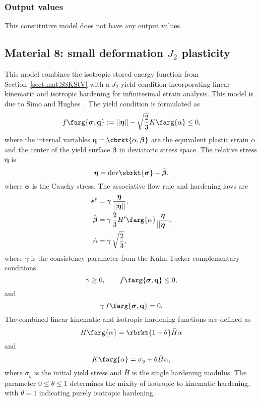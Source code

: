 \subsubsection{Output values}
This constitutive model does not have any output values.

\subsection{Material 8: small deformation $J_{2}$ plasticity}
\label{sect.mat.SS.J2.LinearHardening}
This model combines the isotropic stored energy function from 
Section~\ref{sect.mat.SSKStV} with a $J_{2}$ yield
condition incorporating linear kinematic and 
isotropic hardening for infinitesimal strain analysis. 
This model is due to Simo and Hughes~\cite{Simo1998}. 
The yield condition is formulated as
\begin{equation}
	f\farg{\boldsymbol{\sigma}, \mathbf{q}} := 
	||\boldsymbol{\eta}|| 
	- \sqrt{\frac{2}{3}} K\farg{\alpha} \le 0,
\end{equation}
where the internal variables 
$\mathbf{q} = \cbrkt{\alpha, \bar{\boldsymbol{\beta}}}$ are
the equivalent plastic strain $\alpha$ and the center of
the yield surface $\bar{\boldsymbol{\beta}}$ in deviatoric
stress space. The relative stress $\boldsymbol{\eta}$ is
\begin{equation}
\boldsymbol{\eta} = \textrm{dev}\sbrkt{\boldsymbol\sigma} - 
\bar{\boldsymbol{\beta}},
\end{equation}
where $\boldsymbol{\sigma}$ is the Cauchy stress. The associative flow rule
and hardening laws are
\begin{align}
\Dot{\boldsymbol{\epsilon}}^{p} &= \gamma\,
   \frac{\boldsymbol{\eta}}{||\boldsymbol{\eta}||}, \\
\Dot{\Bar{\boldsymbol{\beta}}} &= \gamma\, \frac{2}{3} H'\farg{\alpha}
   \frac{\boldsymbol{\eta}}{||\boldsymbol{\eta}||}, \\
\Dot{\alpha} &= \gamma\,\sqrt{\frac{2}{3}},
\end{align}
where $\gamma$ is the consistency parameter from the Kuhn-Tucker
complementary conditions
\begin{equation}
\label{eq.Kuhn-Tucker.1}
\gamma \ge 0, \qquad f\farg{\boldsymbol{\sigma}, \mathbf{q}} \le 0,
\end{equation}
and
\begin{equation}
\label{eq.Kuhn-Tucker.2}
\gamma\,f\farg{\boldsymbol{\sigma}, \mathbf{q}} = 0.
\end{equation}
The combined linear kinematic and isotropic hardening functions are
defined as
\begin{equation}
	H\farg{\alpha} = \rbrkt{1 - \theta} \bar{H} \alpha
\end{equation}
and
\begin{equation}
	K\farg{\alpha} = \sigma_{y} + \theta \bar{H} \alpha,
\end{equation}
where $\sigma_{y}$ is the initial yield stress and
$\bar{H}$ is the single hardening modulus.
The parameter $0 \le \theta \le 1$ determines the mixity of 
isotropic to kinematic hardening, with $\theta = 1$ indicating purely 
isotropic hardening.

